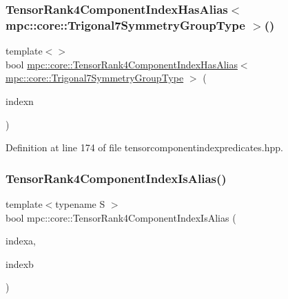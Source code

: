 \subsubsection{\texorpdfstring{Tensor\+Rank4\+Component\+Index\+Has\+Alias$<$ mpc\+::core\+::\+Trigonal7\+Symmetry\+Group\+Type $>$()}{TensorRank4ComponentIndexHasAlias< mpc::core::Trigonal7SymmetryGroupType >()}}
{\footnotesize\ttfamily template$<$$>$ \\
bool \mbox{\hyperlink{namespacempc_1_1core_a7242817d0014fa66d25e5cf10a2c4ddf}{mpc\+::core\+::\+Tensor\+Rank4\+Component\+Index\+Has\+Alias}}$<$ \mbox{\hyperlink{structmpc_1_1core_1_1_trigonal7_symmetry_group_type}{mpc\+::core\+::\+Trigonal7\+Symmetry\+Group\+Type}} $>$ (\begin{DoxyParamCaption}\item[{const \mbox{\hyperlink{namespacempc_1_1core_a54c081f41b2475abd10182bf023805d2}{mpc\+::core\+::\+Tensor\+Rank4\+Component\+Index}} \&}]{indexn }\end{DoxyParamCaption})\hspace{0.3cm}{\ttfamily [inline]}}



Definition at line 174 of file tensorcomponentindexpredicates.\+hpp.

\mbox{\label{namespacempc_1_1core_a6a2bb811eb9c52ad922c8e96c8f0386b}} 
\subsubsection{\texorpdfstring{Tensor\+Rank4\+Component\+Index\+Is\+Alias()}{TensorRank4ComponentIndexIsAlias()}}
{\footnotesize\ttfamily template$<$typename S $>$ \\
bool mpc\+::core\+::\+Tensor\+Rank4\+Component\+Index\+Is\+Alias (\begin{DoxyParamCaption}\item[{const \mbox{\hyperlink{namespacempc_1_1core_a54c081f41b2475abd10182bf023805d2}{mpc\+::core\+::\+Tensor\+Rank4\+Component\+Index}} \&}]{indexa,  }\item[{const \mbox{\hyperlink{namespacempc_1_1core_a54c081f41b2475abd10182bf023805d2}{mpc\+::core\+::\+Tensor\+Rank4\+Component\+Index}} \&}]{indexb }\end{DoxyParamCaption})\hspace{0.3cm}{\ttfamily [inline]}}



